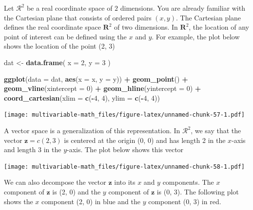 \documentclass[
]{book}
\newenvironment{Shaded}{\begin{snugshade}}{\end{snugshade}}
\newcommand{\DataTypeTok}[1]{\textcolor[rgb]{0.13,0.29,0.53}{#1}}
\newcommand{\DecValTok}[1]{\textcolor[rgb]{0.00,0.00,0.81}{#1}}
\newcommand{\KeywordTok}[1]{\textcolor[rgb]{0.13,0.29,0.53}{\textbf{#1}}}
\newcommand{\NormalTok}[1]{#1}
\newcommand{\OperatorTok}[1]{\textcolor[rgb]{0.81,0.36,0.00}{\textbf{#1}}}
\newcommand{\StringTok}[1]{\textcolor[rgb]{0.31,0.60,0.02}{#1}}
\theoremstyle{definition}
\theoremstyle{definition}
\theoremstyle{definition}
\theoremstyle{definition}
\theoremstyle{remark}
\begin{document}
Let \(\mathcal{R}^2\) be a real coordinate space of \(2\) dimensions. You are already familiar with the Cartesian plane that consists of ordered pairs \((x, y)\). The Cartesian plane defines the real coordinate space \(\mathbf{R}^2\) of two dimensions. In \(\mathbf{R}^2\), the location of any point of interest can be defined using the \(x\) and \(y\). For example, the plot below shows the location of the point (2, 3)

\begin{Shaded}
\begin{Highlighting}[]
\NormalTok{dat <-}\StringTok{ }\KeywordTok{data.frame}\NormalTok{(}
    \DataTypeTok{x =} \DecValTok{2}\NormalTok{,}
    \DataTypeTok{y =} \DecValTok{3}
\NormalTok{)}

\KeywordTok{ggplot}\NormalTok{(}\DataTypeTok{data =}\NormalTok{ dat, }\KeywordTok{aes}\NormalTok{(}\DataTypeTok{x =}\NormalTok{ x, }\DataTypeTok{y =}\NormalTok{ y)) }\OperatorTok{+}
\StringTok{    }\KeywordTok{geom_point}\NormalTok{() }\OperatorTok{+}
\StringTok{    }\KeywordTok{geom_vline}\NormalTok{(}\DataTypeTok{xintercept =} \DecValTok{0}\NormalTok{) }\OperatorTok{+}\StringTok{ }
\StringTok{    }\KeywordTok{geom_hline}\NormalTok{(}\DataTypeTok{yintercept =} \DecValTok{0}\NormalTok{) }\OperatorTok{+}
\StringTok{    }\KeywordTok{coord_cartesian}\NormalTok{(}\DataTypeTok{xlim =} \KeywordTok{c}\NormalTok{(}\OperatorTok{-}\DecValTok{4}\NormalTok{, }\DecValTok{4}\NormalTok{), }\DataTypeTok{ylim =} \KeywordTok{c}\NormalTok{(}\OperatorTok{-}\DecValTok{4}\NormalTok{, }\DecValTok{4}\NormalTok{))}
\end{Highlighting}
\end{Shaded}

\texttt{[image: multivariable-math\_files/figure-latex/unnamed-chunk-57-1.pdf]}

A vector space is a generalization of this representation. In \(\mathcal{R}^2\), we say that the vector \(\mathbf{z} = c(2, 3)\) is centered at the origin (0, 0) and has length 2 in the \(x\)-axis and length 3 in the \(y\)-axis. The plot below shows this vector

\texttt{[image: multivariable-math\_files/figure-latex/unnamed-chunk-58-1.pdf]}

We can also decompose the vector \(\mathbf{z}\) into its \(x\) and \(y\) components. The \(x\) component of \(\mathbf{z}\) is (2, 0) and the \(y\) component of \(\mathbf{z}\) is (0, 3). The following plot shows the \(x\) component (2, 0) in blue and the \(y\) component (0, 3) in red.
\end{document}
